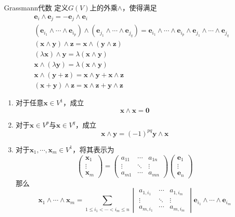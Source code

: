 \documentclass[lang = cn, scheme = chinese, thmcnt = section]{elegantbook}
\newcommand{\bs}{\boldsymbol}          %
\begin{document}
\begin{definition}{Grassmann代数}
	定义$G(V)$上的外乘$\wedge$，使得满足
	\begin{align*}
		& \bs{e}_i\wedge \bs{e}_j=-\bs{e}_j\wedge \bs{e}_i\\
		& (\bs{e}_{i_1}\wedge\cdots\wedge \bs{e}_{i_p})\wedge(\bs{e}_{j_1}\wedge\cdots\wedge \bs{e}_{j_q})=\bs{e}_{i_1}\wedge\cdots\wedge \bs{e}_{i_p}\wedge\bs{e}_{j_1}\wedge\cdots\wedge \bs{e}_{j_q}\\
		& (\bs{x}\wedge\bs{y})\wedge\bs{z}=\bs{x}\wedge(\bs{y}\wedge\bs{z})\\
		& (\lambda\bs{x})\wedge\bs{y}=\lambda(\bs{x}\wedge\bs{y})\\
		& \bs{x}\wedge(\lambda\bs{y})=\lambda(\bs{x}\wedge\bs{y})\\
		& \bs{x}\wedge(\bs{y}+\bs{z})=\bs{x}\wedge\bs{y}+\bs{x}\wedge\bs{z}\\
		& (\bs{x}+\bs{y})\wedge\bs{z}=\bs{x}\wedge\bs{z}+\bs{y}\wedge\bs{z}
	\end{align*}
\end{definition}

\begin{theorem}
	\begin{enumerate}
		\item 对于任意$\bs{x}\in V^1$，成立%
		$$
		\bs{x}\wedge\bs{x}=\bs{0}
		$$
		\item 对于$\bs{x}\in V^p$与$\bs{x}\in V^q$，成立%
		$$
		\bs{x}\wedge\bs{y}=(-1)^{pq}\bs{y}\wedge\bs{x}
		$$
		\item 对于$\bs{x}_1,\cdots,\bs{x}_m\in V^1$，将其表示为%
		$$
		\begin{pmatrix}
			\bs{x}_1\\\vdots\\\bs{x}_m
		\end{pmatrix}
		=\begin{pmatrix}
			a_{11} & \cdots & a_{1n}\\
			\vdots & \ddots & \vdots\\
			a_{m1} & \cdots & a_{mn}
		\end{pmatrix}
		\begin{pmatrix}
			\bs{e}_1\\\vdots\\\bs{e}_n
		\end{pmatrix}
		$$
		那么%
		$$
		\bs{x}_1\wedge\cdots\wedge\bs{x}_m
		=\sum_{1\le i_1<\cdots<i_m\le n}
		\begin{vmatrix}
			a_{1,i_1} & \cdots & a_{1,i_m}\\
			\vdots & \ddots & \vdots\\
			a_{m,i_1} & \cdots & a_{m,i_m}
		\end{vmatrix}
		\bs{e}_{i_1}\wedge\cdots\wedge\bs{e}_{i_m}
		$$
	\end{enumerate}
\end{theorem}
\end{document}
